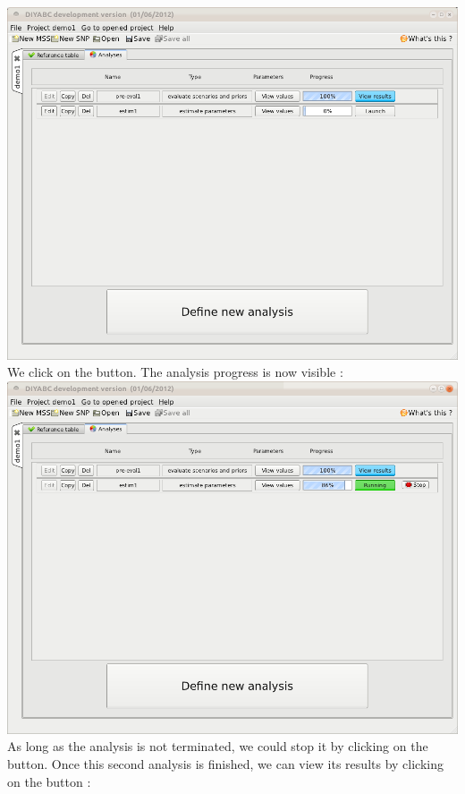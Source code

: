 \includegraphics[scale=0.35]{gui_pictures/Capture-DIYABC-38.png} \\

We click on the  button. The analysis progress is now visible :\\

\includegraphics[scale=0.35]{gui_pictures/Capture-DIYABC-38a.png} \\

As long as the analysis is not terminated, we could stop it by clicking on the   button. Once this second analysis is finished, we can view its results by clicking on the   button :\\

